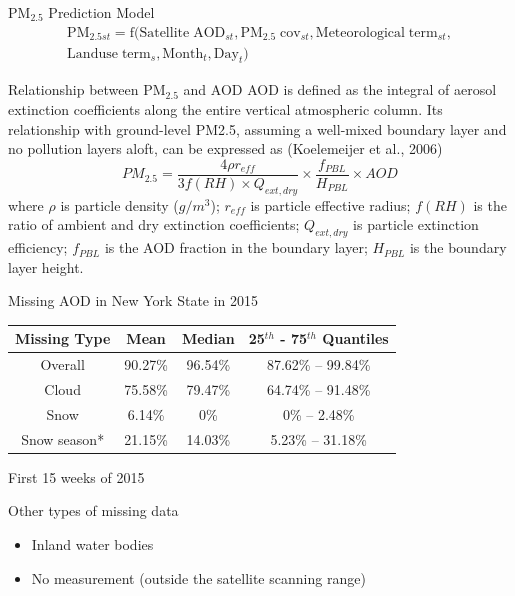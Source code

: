 \documentclass[handout]{beamer} %
\begin{document}
\begin{frame}{PM$_{2.5}$ Prediction Model}
    \begin{align*}
        \mathrm{PM_{2.5\mathit{st}}=f(Satellite\;AOD_{\mathit{st}},PM_{2.5}\;cov_{\mathit{st}},Meteorological\;term_{\mathit{st}}, } \\
        \mathrm{Landuse\;term_\mathit{s},Month_\mathit{t}, Day_\mathit{t})}
    \end{align*}
\end{frame}

\begin{frame}{Relationship between PM$_{2.5}$ and AOD}
    AOD is defined as the integral of aerosol extinction coefficients along the entire vertical atmospheric column. Its relationship with ground-level PM2.5, assuming a well-mixed boundary layer and no pollution layers aloft, can be expressed as (Koelemeijer et al., 2006)
    \begin{equation*}
        PM_{2.5}=\frac{4\rho r_{eff}}{3f(RH)\times Q_{ext,dry}}\times\frac{f_{PBL}}{H_{PBL}}\times AOD
    \end{equation*}
    where $\rho$ is particle density ($g/m^3$); $r_{eff}$ is particle effective radius; $f(RH)$ is the ratio of ambient and dry extinction coefficients; $Q_{ext,dry}$ is particle extinction efficiency; $f_{PBL}$ is the AOD fraction in the boundary layer; $H_{PBL}$ is the boundary layer height.
\end{frame}

\begin{frame}{Missing AOD in New York State in 2015}
    \label{frm:missing}
    \begin{table}
        \centering
        \begin{tabular}{c|c|c|c}
            \hline
            Missing Type & Mean & Median & 25$^{th}$ - 75$^{th}$ Quantiles \\
            \hline
            Overall & 90.27\% & 96.54\% & 87.62\% -- 99.84\% \\
            Cloud & 75.58\% & 79.47\% & 64.74\% -- 91.48\% \\
            Snow & 6.14\% & 0\% & 0\% -- 2.48\% \\
            Snow season* & 21.15\% & 14.03\% & 5.23\% -- 31.18\% \\
            \hline
        \end{tabular}
    \end{table}
    {\footnotesize * First 15 weeks of 2015}
    \begin{block}{Other types of missing data}
        \begin{itemize}
            \item Inland water bodies
            \item No measurement (outside the satellite scanning range)
        \end{itemize}
    \end{block}
\end{frame}
\end{document}
